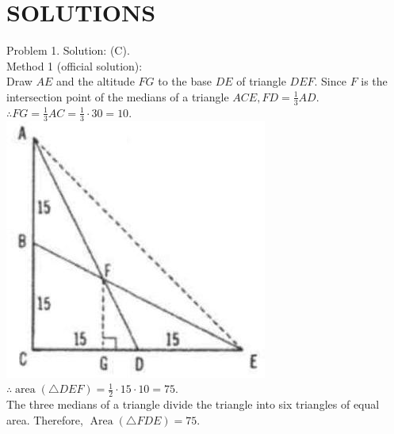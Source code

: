 \documentclass[10pt]{article}
\begin{document}
\section*{SOLUTIONS}
Problem 1. Solution: (C).\\
Method 1 (official solution):\\
Draw \(A E\) and the altitude \(F G\) to the base \(D E\) of triangle \(D E F\). Since \(F\) is the intersection point of the medians of a triangle \(A C E, F D=\frac{1}{3} A D\).\\
\(\therefore F G=\frac{1}{3} A C=\frac{1}{3} \cdot 30=10\).\\
\includegraphics[max width=\textwidth, center]{2025_04_17_97bc1f7e44d93c271a88g-017(1)}\\
\(\therefore \operatorname{area}(\triangle D E F)=\frac{1}{2} \cdot 15 \cdot 10=75\).\\
The three medians of a triangle divide the triangle into six triangles of equal area. Therefore, \(\operatorname{Area}(\triangle F D E)=75\).
\end{document}
